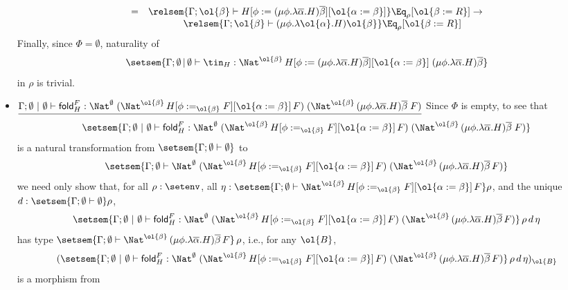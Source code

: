 \documentclass{lmcs}
\theoremstyle{plain}\newtheorem{satz}[thm]{Satz}
\newcommand{\fold}{\mathsf{fold}}
\begin{document}
\begin{itemize}
\[\begin{array}{ll}
= &
 \relsem{\Gamma;\ol{\beta} \vdash H[\phi := (\mu
    \phi.\lambda {\overline \alpha}.H){\overline \beta}][\ol{\alpha :=
      \beta}]}\Eq_\rho[\ol{\beta := R}]\to\\
 & \hspace*{0.5in} \relsem{\Gamma;\ol{\beta} \vdash (\mu
  \phi.\lambda \ol{\alpha}.H)\ol{\beta}} \Eq_\rho[\ol{\beta:=
    R}]
\end{array}\]
Finally, since $\Phi = \emptyset$, naturality of
\[
\setsem{\Gamma;\emptyset \,|\, \emptyset \vdash \tin_H :
  \Nat^{\ol{\beta}} \, H[\phi := (\mu \phi.\lambda
    {\overline \alpha}.H){\overline \beta}][\ol{\alpha := \beta}]
  \;(\mu \phi.\lambda {\overline \alpha}.H){\overline \beta}}
\]
in $\rho$ is trivial.

\item
$\underline{\Gamma; \emptyset~|~\emptyset \vdash \fold^F_H :
  \Nat^\emptyset\;(\Nat^{\ol{\beta}}\,H[\phi
    :=_{\ol{\beta}} F][\ol{\alpha := \beta}]\,F)\;
  (\Nat^{{\ol{\beta}} }\,(\mu \phi.\lambda \overline
  \alpha.H)\overline \beta \;F)}$ \; Since $\Phi$ is empty, to see
  that 
  $$\setsem{ \Gamma; \emptyset~|~\emptyset \vdash \fold^F_H :
    \Nat^\emptyset\;(\Nat^{\ol{\beta}}\,H[\phi :=_{\ol{\beta}}
      F][\ol{\alpha := \beta}]\,F)\; (\Nat^{{\ol{\beta}} }\,(\mu
    \phi.\lambda \overline \alpha.H)\overline \beta \;F)}$$ is a
  natural transformation from $\setsem{\Gamma;\emptyset \vdash
    \emptyset}$ to \[\setsem{\Gamma; \emptyset \vdash
    \Nat^\emptyset\;(\Nat^{\ol{\beta}}\,H[\phi :=_{\ol{\beta}}
      F][\ol{\alpha := \beta}]\,F)\; (\Nat^{{\ol{\beta}} }\,(\mu
    \phi.\lambda \overline \alpha.H)\overline \beta\,F)}\] we need
  only show that, for all $\rho : \setenv$, all $\eta :
  \setsem{\Gamma; \emptyset \vdash \Nat^{\ol{\beta}}\,H[\phi
      :=_{\ol{\beta}} F][\ol{\alpha := \beta}]\,F} \rho$, and the
  unique $d : \setsem{\Gamma;\emptyset \vdash \emptyset} \rho$, 
\[ \setsem{\Gamma; \emptyset~|~\emptyset \vdash \fold^F_H :
  \Nat^\emptyset\;(\Nat^{\ol{\beta}}\,H[\phi
    :=_{\ol{\beta}} F][\ol{\alpha := \beta}]\,F)\;
  (\Nat^{{\ol{\beta}} }\,(\mu \phi.\lambda \overline
  \alpha.H)\overline \beta\,F)}\,\rho\,d\,\eta\] has type
$\setsem{\Gamma; \emptyset \vdash \Nat^{{\ol{\beta}}
  }\,(\mu \phi.\lambda \overline \alpha.H)\overline \beta\,F}\,\rho$,
i.e., for any $\ol{B}$,
\[(\setsem{\Gamma; \emptyset~|~\emptyset \vdash \fold^F_H :
  \Nat^\emptyset\;(\Nat^{\ol{\beta}}\,H[\phi :=_{\ol{\beta}}
    F][\ol{\alpha := \beta}]\,F)\; (\Nat^{{\ol{\beta}} }\,(\mu
  \phi.\lambda \overline \alpha.H)\overline
  \beta\,F)}\,\rho\,d\,\eta)_{\ol{B}}\] is a morphism from

\end{itemize}
\end{document}
